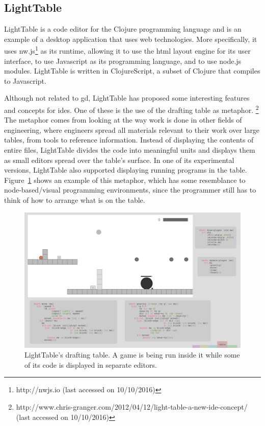 \subsection{LightTable}
\label{lighttable:related}
LightTable\cite{lighttable2015site} is a code editor for the Clojure programming language\cite{hickey2008clojure} and is an example of a desktop application that uses web technologies.
More specifically, it uses nw.js\footnote{http://nwjs.io (last accessed on 10/10/2016)} as its runtime, allowing it to use the html layout engine for its user interface, to use Javascript as its programming language, and to use node.js\cite{tilkov2010node} modules.
LightTable is written in ClojureScript\cite{10.1109/MIC.2011.148}, a subset of Clojure that compiles to Javascript.

Although not related to \gls{gd}, LightTable has proposed some interesting features and concepts for \glspl{ide}.
One of these is the use of the drafting table as metaphor.%
\footnote{http://www.chris-granger.com/2012/04/12/light-table-a-new-ide-concept/ (last accessed on 10/10/2016)}
The metaphor comes from looking at the way work is done in other fields of engineering, where engineers spread all materials relevant to their work over large tables, from tools to reference information.
Instead of displaying the contents of entire files, LightTable divides the code into meaningful units and displays them as small editors spread over the table's surface.
In one of its experimental versions, LightTable also supported displaying running programs in the table.
Figure~\ref{fig:lt:draft:table} shows an example of this metaphor, which has some resemblance to node-based/visual programming environments, since the programmer still has to think of how to arrange what is on the table.

\begin{figure}
  \centering
  \includegraphics[width=12cm]{./images/lt_game_example__inv}
  \caption[LightTable's drafting table showing a game.]{LightTable's drafting table. A game is being run inside it while some of its code is displayed in separate editors.}
  \label{fig:lt:draft:table}
\end{figure}

